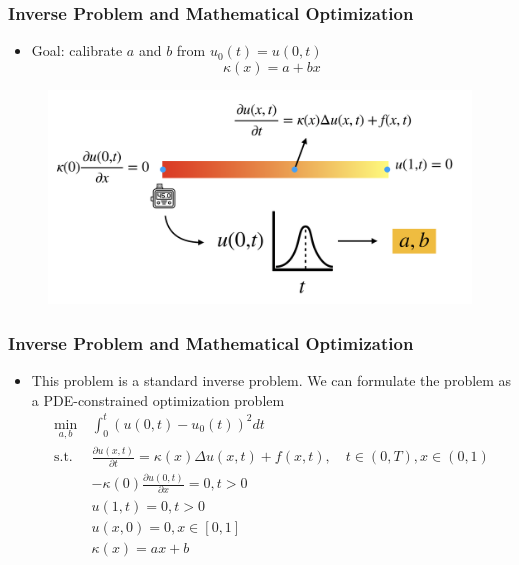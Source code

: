 \documentclass{beamer}
\begin{document}
\begin{frame}
	\frametitle{Inverse Problem and Mathematical Optimization}
	\begin{itemize}
		\item Goal: calibrate $a$ and $b$ from $u_0(t) = u(0, t)$
		      $$\kappa(x) = a + bx$$
	\end{itemize}
	\begin{figure}
		\centering
		\includegraphics[width=1.0\textwidth]{figures/measure}
	\end{figure}

\end{frame}
\begin{frame}
	\frametitle{Inverse Problem and Mathematical Optimization}
	\begin{itemize}
		\item This problem is a standard inverse problem. We can formulate the problem as a PDE-constrained optimization problem
		      $$\begin{aligned}
				      \min_{a, b}\    & \int_{0}^t ( u(0, t)- u_0(t))^2 dt                                                                    \\
				      \mathrm{s.t.}\  & \frac{\partial u(x, t)}{\partial t} = \kappa(x)\Delta u(x, t) + f(x, t), \quad t\in (0,T), x\in (0,1) \\
				                      & -\kappa(0)\frac{\partial u(0,t)}{\partial x} = 0, t>0                                                 \\
				                      & u(1, t) = 0, t>0                                                                                      \\
				                      & u(x, 0) = 0, x\in [0,1]                                                                               \\
				                      & \kappa(x) = a x + b
			      \end{aligned}$$

	\end{itemize}
\end{frame}
\end{document}

